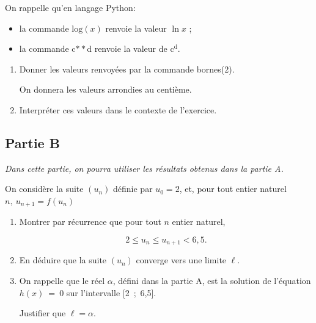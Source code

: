 \begin{enumerate}
On rappelle qu'en langage Python:


\begin{itemize}[label=$\bullet~$]
\item la commande $\text{log} (x)$ renvoie la valeur $\ln x$ ; 
\item la commande c$**$d renvoie la valeur de $\text{c}^{\text{d}}$.
\end{itemize}

	\begin{enumerate}
		\item Donner les valeurs renvoyées par la commande bornes(2).
		
On donnera les valeurs arrondies au centième.
		\item Interpréter ces valeurs dans le contexte de l'exercice.
	\end{enumerate}
\end{enumerate}

\subsection*{Partie B}

\emph{Dans cette partie, on pourra utiliser les résultats obtenus dans la partie A.}

On considère la suite $(u_n)$ définie par $u_0 = 2$, et, pour tout entier naturel $n,\: u_{n+1} = f\left(u_n\right)$

\begin{enumerate}
\item Montrer par récurrence que pour tout $n$ entier naturel,

\[2 \leqslant u_n \leqslant u_{n+1} < 6,5.\]
\item En déduire que la suite $(u_n)$ converge vers une limite $\ell$.
\item On rappelle que le réel $\alpha$, défini dans la partie A, est la solution de l'équation $h(x)~=~0$ sur l'intervalle [2~;~6,5].

Justifier que $\ell = \alpha$.
\end{enumerate}

\bigskip
